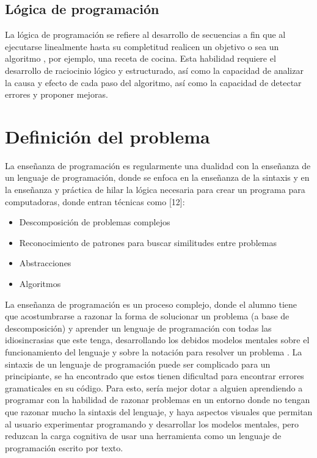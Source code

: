 \subsection{Lógica de programación}
La lógica de programación se refiere al desarrollo de secuencias a fin que al ejecutarse linealmente hasta su completitud realicen un objetivo o sea un algoritmo \cite{logica_programacion}, por ejemplo, una receta de cocina. Esta habilidad requiere el desarrollo de raciocinio lógico y estructurado, así como la capacidad de analizar la causa y efecto de cada paso del algoritmo, así como la capacidad de detectar errores y proponer mejoras.

\section{Definición del problema}
La enseñanza de programación es regularmente una dualidad con la enseñanza de un lenguaje de programación, donde se enfoca en la enseñanza de la sintaxis y en la enseñanza y práctica de hilar la lógica necesaria para crear un programa para computadoras, donde entran técnicas como [12]:
\begin{itemize}
    \item Descomposición de problemas complejos
    \item Reconocimiento de patrones para buscar similitudes entre problemas
    \item Abstracciones
    \item Algoritmos
\end{itemize}

La enseñanza de programación es un proceso complejo, donde el alumno tiene que acostumbrarse a razonar la forma de solucionar un problema (a base de descomposición) y aprender un lenguaje de programación con todas las idiosincrasias que este tenga, desarrollando los debidos modelos mentales sobre el funcionamiento del lenguaje y sobre la notación para resolver un problema \cite{mow-a}. La sintaxis de un lenguaje de programación puede ser complicado para un principiante, se ha encontrado que estos tienen dificultad para encontrar errores gramaticales en su código. Para esto, sería mejor dotar a alguien aprendiendo a programar con la habilidad de razonar problemas en un entorno donde no tengan que razonar mucho la sintaxis del lenguaje, y haya aspectos visuales que permitan al usuario experimentar programando y desarrollar los modelos mentales, pero reduzcan la carga cognitiva de usar una herramienta como un lenguaje de programación escrito por texto. 

